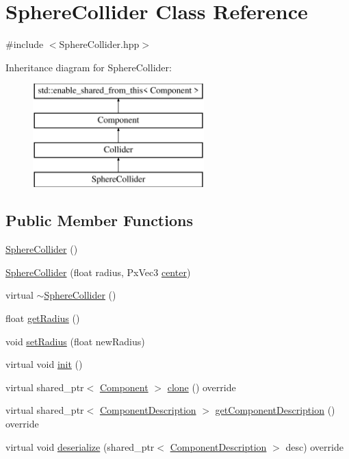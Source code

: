 \hypertarget{class_sphere_collider}{}\section{Sphere\+Collider Class Reference}
\label{class_sphere_collider}


{\ttfamily \#include $<$Sphere\+Collider.\+hpp$>$}

Inheritance diagram for Sphere\+Collider\+:\begin{figure}[H]
\begin{center}
\leavevmode
\includegraphics[height=4.000000cm]{class_sphere_collider}
\end{center}
\end{figure}
\subsection*{Public Member Functions}
\begin{DoxyCompactItemize}
\item 
\hyperlink{class_sphere_collider_af46ca28e45d8efa559f097aadfb9bc44}{Sphere\+Collider} ()
\item 
\hyperlink{class_sphere_collider_a9e4b771c5e43efbbc75aa8359748e514}{Sphere\+Collider} (float radius, Px\+Vec3 \hyperlink{class_collider_a42b57aa35ab665daf89ae844e479c560}{center})
\item 
virtual \hyperlink{class_sphere_collider_ac3f355cae4d6cbd988bf7b4ea74b5472}{$\sim$\+Sphere\+Collider} ()
\item 
float \hyperlink{class_sphere_collider_af9a9507ea31d7ce40dbf2bf3399a731b}{get\+Radius} ()
\item 
void \hyperlink{class_sphere_collider_ae8fb3c78c7cda1b89dbdb569961fef63}{set\+Radius} (float new\+Radius)
\item 
virtual void \hyperlink{class_sphere_collider_aa51773fa54349bec5730b3ae528c4179}{init} ()
\item 
virtual shared\+\_\+ptr$<$ \hyperlink{class_component}{Component} $>$ \hyperlink{class_sphere_collider_a68cd4eaf4ee2b13ac48efc38a760ff36}{clone} () override
\item 
virtual shared\+\_\+ptr$<$ \hyperlink{class_component_description}{Component\+Description} $>$ \hyperlink{group__serialization__functions_gac6dec979a6872bf1ca8a78fb2f44c511}{get\+Component\+Description} () override
\item 
virtual void \hyperlink{group__serialization__functions_ga26f4dcd8bdc47e087b7e8f57c7879ca0}{deserialize} (shared\+\_\+ptr$<$ \hyperlink{class_component_description}{Component\+Description} $>$ desc) override
\end{DoxyCompactItemize}
